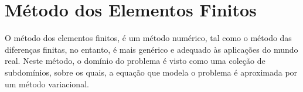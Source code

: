 \section{Método dos Elementos Finitos}



O método dos elementos finitos, é um método numérico, tal como o método das diferenças finitas, no entanto, é mais genérico e adequado às aplicações do mundo real. Neste método, o domínio do problema é visto como uma coleção de subdomínios, sobre os quais, a equação que modela o problema é aproximada por um método variacional.
\citep[p. 13]{reddy}


